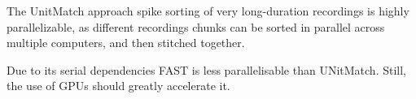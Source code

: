 \begin{comment}
    \item[Brain state fluctuations:] Awake, drowsy, sleep (REM/NREM), quiet
        wakefulness, exploration alter spike statistics and background noise
        levels. They can completely inhibit whole circuits and make neurons
        dissapear or reappear for extended time intervals as brain states
        fluctuate.

\end{description}

To spike sort NaLoDuCo recordings offline we will evaluate FAST and UnitMatch.
%
However, UnitMatch cannot address the above non-stationarities; for example, it
cannot handle neurons that appear and dissappear periodically. We will extend
it to do so.
%
And FAST was designed for tetrodes recordings, so we will adapt it to process
recordings from Neuropixels probes.

For automatic quality control and automatic unit labeling (e.g., good, bad,
multimunit) we will use BombCell~\citep{fabreEtAl23}.

For UniMatch, we will benchmark different base methods using
SpikeInterface~\citep{buccinoEtAl20}.

% 

% 
\end{comment}



The UnitMatch approach spike sorting of very long-duration recordings is
highly parallelizable, as different recordings chunks can be sorted in parallel
across multiple computers, and then stitched together.

Due to its serial dependencies FAST is less parallelisable than UNitMatch.
Still, the use of GPUs should greatly accelerate it.

